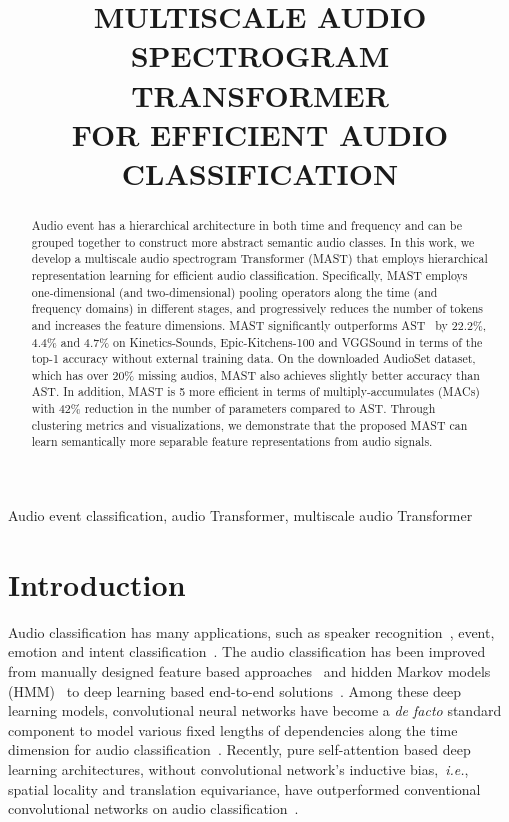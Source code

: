 \documentclass{article}
\title{MULTISCALE AUDIO SPECTROGRAM TRANSFORMER \\ FOR EFFICIENT AUDIO CLASSIFICATION}
\def\ie{\emph{i.e.}}
\begin{document}
\maketitle
\begin{abstract}
Audio event has a hierarchical architecture in both time and frequency and can be grouped together to construct more abstract semantic audio classes. In this work, we develop a multiscale audio spectrogram Transformer (MAST) that employs hierarchical representation learning for efficient audio classification. Specifically, MAST employs one-dimensional (and two-dimensional) pooling operators along the time (and frequency domains) in different stages, and progressively reduces the number of tokens and increases the feature dimensions. MAST significantly outperforms AST~\cite{gong2021ast} by 22.2\%, 4.4\% and 4.7\% on Kinetics-Sounds, Epic-Kitchens-100 and VGGSound in terms of the top-1 accuracy without external training data. On the downloaded AudioSet dataset, which has over 20\% missing audios, MAST also achieves slightly better accuracy than AST. In addition, MAST is 5 more efficient in terms of multiply-accumulates (MACs) with 42\% reduction in the number of parameters compared to AST. Through clustering metrics and visualizations, we demonstrate that the proposed MAST can learn semantically more separable feature representations from audio signals.  \end{abstract}
\begin{keywords}
Audio event classification, audio Transformer, multiscale audio Transformer
\end{keywords}
\section{Introduction}
\label{sec:intro}
Audio classification has many applications, such as speaker recognition~\cite{zhu2021speechnas}, event, emotion and intent classification~\cite{li2018attention,gong2021ast}. The audio classification has been improved from manually designed feature based approaches~\cite{eyben2013recent,schuller2013interspeech} and hidden Markov models (HMM)~\cite{woodard1992modeling} to deep learning based end-to-end solutions~\cite{jaitly2011learning,dieleman2014end,trigeorgis2016adieu}. Among these deep learning models, convolutional neural networks have become a \textit{de facto} standard component to model various fixed lengths of dependencies along the time dimension for audio classification~\cite{lecun1995convolutional,hershey2017cnn}. Recently, pure self-attention based deep learning architectures, without convolutional network's inductive bias,~\ie, spatial locality and translation equivariance, have outperformed conventional convolutional networks on audio classification~\cite{gong2021ast,gong2022ssast}.  
\end{document}
